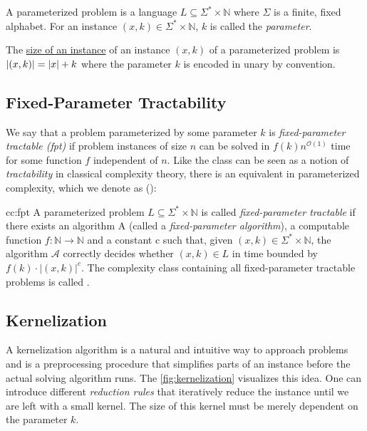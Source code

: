 \begin{definition}
    A parameterized problem is a language $L\subseteq\Sigma^*\times \mathbb{N}$ where $\Sigma$ is a finite, fixed alphabet.
    For an instance $(x,k) \in \Sigma^*\times \mathbb{N}$, $k$ is called the \textit{parameter}.

    The \underline{size of an instance} of an instance $(x,k)$ of a parameterized problem is $\abs{(x,k)} = \abs{x} + k$ where the parameter $k$ is encoded in unary by convention.
\end{definition}

\subsection{Fixed-Parameter Tractability}
We say that a problem parameterized by some parameter $k$ is \textit{fixed-parameter tractable (fpt)} if problem instances of size $n$ can be solved in $f(k)n^{\mathcal{O}(1)}$ time for some function $f$ independent of $n$. 
Like the class \Pt can be seen as a notion of \textit{tractability} in classical complexity theory, there is an equivalent in parameterized complexity, which we denote as \FPTl (\FPT):

\begin{cc} {cc:fpt}
    A parameterized problem $L\subseteq\Sigma^*\times\mathbb{N}$ is called \textit{fixed-parameter tractable} if there exists an algorithm A (called a \textit{fixed-parameter algorithm}), a computable function $f:\mathbb{N} \rightarrow \mathbb{N}$ and a constant c such that, given $(x,k) \in \Sigma^* \times \mathbb{N}$, the algorithm $\mathcal{A}$ correctly decides whether $(x,k) \in L$ in time bounded by $f(k) \cdot |(x,k)|^c$. The complexity class containing all fixed-parameter tractable problems is called \FPT.
\end{cc}
\subsection{Kernelization}

A kernelization algorithm is a natural and intuitive way to approach problems and is a preprocessing procedure that simplifies parts of an instance before the actual solving algorithm runs. 
The \cref{fig:kernelization} visualizes this idea.
One can introduce different \textit{reduction rules} that iteratively reduce the instance until we are left with a small kernel. 
The size of this kernel must be merely dependent on the parameter $k$.

